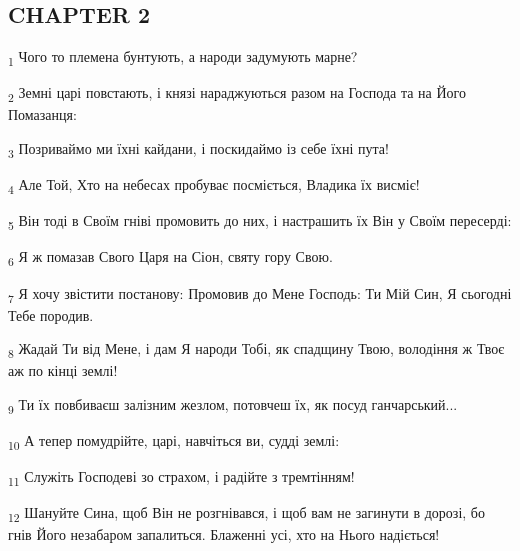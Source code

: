 \subsection{CHAPTER 2}
\begin{tcolorbox}
\textsubscript{1} Чого то племена бунтують, а народи задумують марне?
\end{tcolorbox}
\begin{tcolorbox}
\textsubscript{2} Земні царі повстають, і князі нараджуються разом на Господа та на Його Помазанця:
\end{tcolorbox}
\begin{tcolorbox}
\textsubscript{3} Позриваймо ми їхні кайдани, і поскидаймо із себе їхні пута!
\end{tcolorbox}
\begin{tcolorbox}
\textsubscript{4} Але Той, Хто на небесах пробуває посміється, Владика їх висміє!
\end{tcolorbox}
\begin{tcolorbox}
\textsubscript{5} Він тоді в Своїм гніві промовить до них, і настрашить їх Він у Своїм пересерді:
\end{tcolorbox}
\begin{tcolorbox}
\textsubscript{6} Я ж помазав Свого Царя на Сіон, святу гору Свою.
\end{tcolorbox}
\begin{tcolorbox}
\textsubscript{7} Я хочу звістити постанову: Промовив до Мене Господь: Ти Мій Син, Я сьогодні Тебе породив.
\end{tcolorbox}
\begin{tcolorbox}
\textsubscript{8} Жадай Ти від Мене, і дам Я народи Тобі, як спадщину Твою, володіння ж Твоє аж по кінці землі!
\end{tcolorbox}
\begin{tcolorbox}
\textsubscript{9} Ти їх повбиваєш залізним жезлом, потовчеш їх, як посуд ганчарський...
\end{tcolorbox}
\begin{tcolorbox}
\textsubscript{10} А тепер помудрійте, царі, навчіться ви, судді землі:
\end{tcolorbox}
\begin{tcolorbox}
\textsubscript{11} Служіть Господеві зо страхом, і радійте з тремтінням!
\end{tcolorbox}
\begin{tcolorbox}
\textsubscript{12} Шануйте Сина, щоб Він не розгнівався, і щоб вам не загинути в дорозі, бо гнів Його незабаром запалиться. Блаженні усі, хто на Нього надіється!
\end{tcolorbox}
